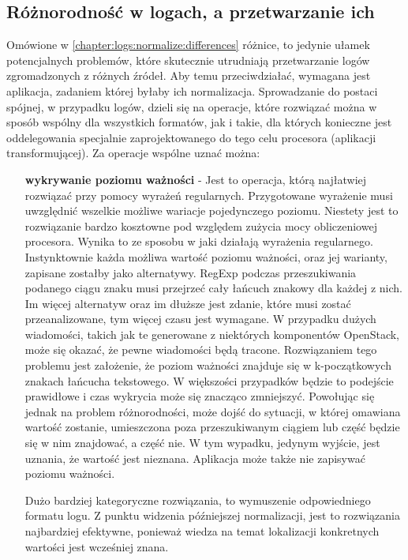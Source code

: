     \subsection{Różnorodność w logach, a przetwarzanie ich}
    Omówione w \ref{chapter:logs:normalize:differences} różnice, to jedynie ułamek potencjalnych problemów, 
    które skutecznie utrudniają przetwarzanie logów zgromadzonych z różnych źródeł. Aby temu przeciwdziałać, wymagana jest
    aplikacja, zadaniem której byłaby ich normalizacja. Sprowadzanie do postaci spójnej, w przypadku logów, dzieli się
    na operacje, które rozwiązać można w sposób wspólny dla wszystkich formatów, jak i takie, dla których konieczne jest
    oddelegowania specjalnie zaprojektowanego do tego celu procesora (aplikacji transformującej). 
    Za operacje wspólne uznać można:
    \begin{itemize}
        \item[\textbf{wykrywanie poziomu ważności}] - Jest to operacja, którą najłatwiej rozwiązać przy pomocy wyrażeń regularnych.
        Przygotowane wyrażenie musi uwzględnić wszelkie możliwe wariacje pojedynczego poziomu. Niestety jest to
        rozwiązanie bardzo kosztowne pod względem zużycia mocy obliczeniowej procesora. Wynika to ze sposobu w jaki działają 
        wyrażenia regularnego. Instynktownie każda możliwa wartość poziomu ważności, oraz jej warianty, zapisane zostałby 
        jako alternatywy. RegExp podczas przeszukiwania podanego ciągu znaku musi przejrzeć cały łańcuch znakowy dla każdej z nich.
        Im więcej alternatyw oraz im dłuższe jest zdanie, które musi zostać przeanalizowane, tym więcej czasu jest wymagane.
        W przypadku dużych wiadomości, takich jak te generowane z niektórych komponentów OpenStack, może się okazać, że 
        pewne wiadomości będą tracone. Rozwiązaniem tego problemu jest założenie, że poziom ważności znajduje się w k-początkowych
        znakach łańcucha tekstowego. W większości przypadków będzie to podejście prawidłowe i czas wykrycia może się znacząco zmniejszyć.
        Powołując się jednak na problem różnorodności, może dojść do sytuacji, w której omawiana wartość zostanie, umieszczona
        poza przeszukiwanym ciągiem lub część będzie się w nim znajdować, a część nie. W tym wypadku, jedynym wyjście, jest uznania, że
        wartość jest nieznana. Aplikacja może także nie zapisywać poziomu ważności.
        
        Dużo bardziej kategoryczne rozwiązania, to wymuszenie odpowiedniego formatu logu. Z punktu
        widzenia późniejszej normalizacji, jest to rozwiązania najbardziej efektywne, ponieważ wiedza
        na temat lokalizacji konkretnych wartości jest wcześniej znana.
        

\end{itemize}
